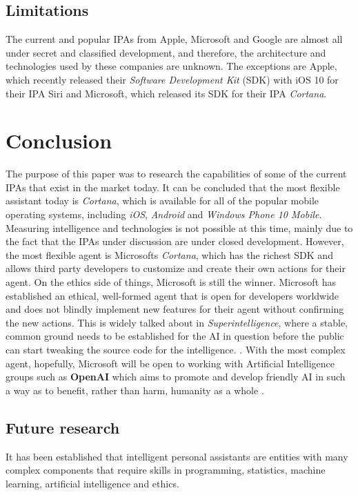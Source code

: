 \documentclass[preprint,12pt]{elsarticle}
\begin{document}
\subsection{Limitations}
The current and popular IPAs from Apple, Microsoft and Google are almost all under secret and classified development, and therefore, the architecture and technologies used by these companies are unknown. The exceptions are Apple, which recently released their \textit{Software Development Kit} (SDK) with iOS 10 for their IPA Siri and Microsoft, which released its SDK for their IPA \textit{Cortana}.


\section{Conclusion}
The purpose of this paper was to research the capabilities of some of the current IPAs that exist in the market today. It can be concluded that the most flexible assistant today is \textit{Cortana}, which is available for all of the popular mobile operating systems, including \textit{iOS}, \textit{Android} and \textit{Windows Phone 10 Mobile}. Measuring intelligence and technologies is not possible at this time, mainly due to the fact that the IPAs under discussion are under closed development. However, the most flexible agent is Microsofts \textit{Cortana}, which has the richest SDK and allows third party developers to customize and create their own actions for their agent. 
On the ethics side of things, Microsoft is still the winner. Microsoft has established an ethical, well-formed agent that is open for developers worldwide and does not blindly implement new features for their agent without confirming the new actions. This is widely talked about in \textit{Superintelligence}, where a stable, common ground needs to be established for the AI in question before the public can start tweaking the source code for the intelligence. \cite{bostrom2014superintelligence}. With the most complex agent, hopefully, Microsoft will be open to working with Artificial Intelligence groups such as \textbf{OpenAI} which aims to promote and develop friendly AI in such a way as to benefit, rather than harm, humanity as a whole \cite{openai2016}.

\subsection{Future research}
It has been established that intelligent personal assistants are entities with many complex components that require skills in programming, statistics, machine learning, artificial intelligence and ethics.
\end{document}
